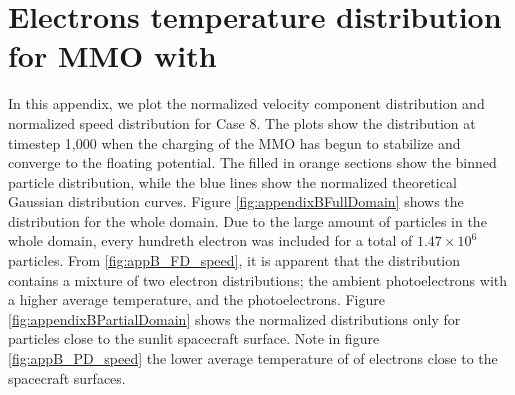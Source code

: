 \chapter{Electrons temperature distribution for MMO with }
\label{sec:appendixB}

In this appendix, we plot the normalized velocity component distribution and normalized speed distribution for Case 8. The plots show the distribution at timestep 1,000 when the charging of the MMO has begun to stabilize and converge to the floating potential. The filled in orange sections show the binned particle distribution, while the blue lines show the normalized theoretical Gaussian distribution curves. Figure \ref{fig:appendixBFullDomain} shows the distribution for the whole domain. Due to the large amount of particles in the whole domain, every hundreth electron was included for a total of $1.47 \times 10^6$ particles. From \ref{fig:appB_FD_speed}, it is apparent that the distribution contains a mixture of two electron distributions; the ambient photoelectrons with a higher average temperature, and the photoelectrons. Figure \ref{fig:appendixBPartialDomain} shows the normalized distributions only for particles close to the sunlit spacecraft surface. Note in figure \ref{fig:appB_PD_speed} the lower average temperature of of electrons close to the spacecraft surfaces.


